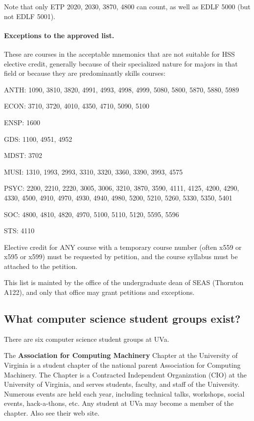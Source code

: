 Note that only ETP 2020, 2030, 3870, 4800 can count, as well as EDLF
5000 (but not EDLF 5001).

\paragraph{Exceptions to the approved list.} These are courses in the
acceptable mnemonics that are not suitable for HSS elective credit,
generally because of their specialized nature for majors in that field
or because they are predominantly skills courses:

\begin{itemlist}
\item ANTH: 1090, 3810, 3820, 4991, 4993, 4998, 4999, 5080, 5800, 5870,
5880, 5989
\item ECON: 3710, 3720, 4010, 4350, 4710, 5090, 5100
\item ENSP: 1600
\item GDS: 1100, 4951, 4952
\item MDST: 3702
\item MUSI: 1310, 1993, 2993, 3310, 3320, 3360, 3390, 3993, 4575
\item PSYC: 2200, 2210, 2220, 3005, 3006, 3210, 3870, 3590, 4111, 4125,
4200, 4290, 4330, 4500, 4910, 4970, 4930, 4940, 4980, 5200, 5210,
5260, 5330, 5350, 5401
\item SOC: 4800, 4810, 4820, 4970, 5100, 5110, 5120, 5595, 5596
\item STS: 4110
\end{itemlist}

Elective credit for ANY course with a temporary course number
(often x559 or x595 or x599) must be requested by petition, and
the course syllabus must be attached to the petition.

This list is mainted by the office of the undergraduate dean of SEAS
(Thornton A122), and only that office may grant petitions and
exceptions.


\subsection{What computer science student groups exist?}
\label{sec-student-groups} 

There are six computer science student groups at UVa.

The {\bf Association for Computing Machinery} Chapter at the
University of Virginia is a student chapter of the national parent
Association for Computing Machinery. The Chapter is a Contracted
Independent Organization (CIO) at the University of Virginia, and
serves students, faculty, and staff of the University. Numerous events
are held each year, including technical talks, workshops, social
events, hack-a-thons, etc.  Any student at UVa may become a member of
the chapter.  Also see their web
site.

